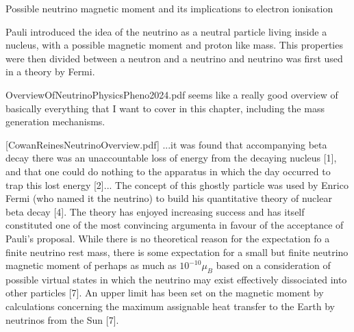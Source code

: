 Possible neutrino magnetic moment and its implications to electron ionisation \cite{NeutrinoMagMomentImplications1934.pdf}

Pauli introduced the idea of the neutrino as a neutral particle living inside a nucleus, with a possible magnetic moment and proton like mass. This properties were then divided between a neutron and a neutrino and neutrino was first used in a theory by Fermi.

OverviewOfNeutrinoPhysicsPheno2024.pdf seems like a really good overview of basically everything that I want to cover in this chapter, including the mass generation mechanisms.



[CowanReinesNeutrinoOverview.pdf] ...it was found that accompanying beta decay there was an unaccountable loss of energy from the decaying nucleus [1], and that one could do nothing to the apparatus in which the day occurred to trap this lost energy [2]... The concept of this ghostly particle was used by Enrico Fermi (who named it the neutrino) to build his quantitative theory of nuclear beta decay [4]. The theory has enjoyed increasing success and has itself constituted one of the most convincing argumenta in favour of the acceptance of Pauli's proposal. While there is no theoretical reason for the expectation fo a finite neutrino rest mass, there is some expectation for a small but finite neutrino magnetic moment of perhaps as much as $10^{-10}\mu_B$ based on a consideration of possible virtual states in which the neutrino may exist effectively dissociated into other particles [7]. An upper limit has been set on the magnetic moment by calculations concerning the maximum assignable heat transfer to the Earth by neutrinos from the Sun [7].

